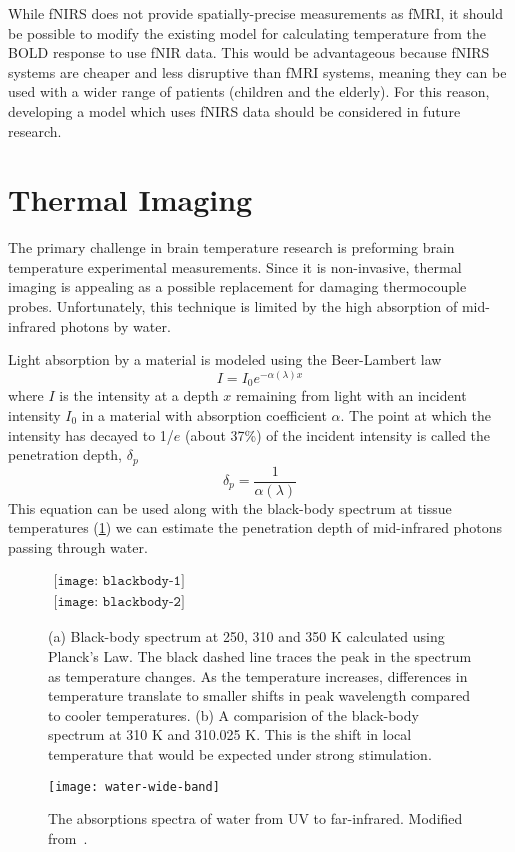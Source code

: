 While fNIRS does not provide spatially-precise measurements as fMRI, it should be possible to modify the existing model for calculating temperature from the BOLD response to use fNIR data. This would be advantageous because fNIRS systems are cheaper and less disruptive than fMRI systems, meaning they can be used with a wider range of patients (children and the elderly).  For this reason, developing a model which uses fNIRS data should be considered in future research.

\section{Thermal Imaging}
\label{sec:ThermalImaging}
The primary challenge in brain temperature research is preforming brain temperature experimental measurements.  Since it is non-invasive, thermal imaging is appealing as a possible replacement for damaging thermocouple probes.  Unfortunately, this technique is limited by the high absorption of mid-infrared photons by water.

Light absorption by a material is modeled using the Beer-Lambert law
\begin{equation}
  I = I_0 e^{-\alpha (\lambda) x} \label{eq:beerlambert}
\end{equation}
where $I$ is the intensity at a depth $x$ remaining from light with an incident intensity $I_0$ in a material with absorption coefficient $\alpha$.  The point at which the intensity has decayed to 1/$e$ (about 37\%) of the incident intensity is called the penetration depth, $\delta_{p}$
\begin{equation}
  \delta_p = \frac{1}{\alpha (\lambda)} \label{eq:penetrationdepth}
\end{equation}
This equation can be used along with the black-body spectrum at tissue temperatures (\cref{fig:blackbody}) we can estimate the penetration depth of mid-infrared photons passing through water.

\begin{figure}[p]
  \centering
  $ 
	\begin{array}{c}
		\texttt{[image: blackbody-1]} \\
		\texttt{[image: blackbody-2]} 
	\end{array}
	$
  \caption[Black-body Spectrum at 250, 310 and 350 K]{\label{fig:blackbody}(a) Black-body spectrum at 250, 310 and 350 K calculated using Planck's Law. The black dashed line traces the peak in the spectrum as temperature changes.  As the temperature increases, differences in temperature translate to smaller shifts in peak wavelength compared to cooler temperatures. (b) A comparision of the black-body spectrum at 310 K and 310.025 K.  This is the shift in local temperature that would be expected under strong stimulation.}
\end{figure}
\begin{figure}[tb]
  \centering
  \texttt{[image: water-wide-band]}
  \caption[Wide-band absorption spectra of water]{\label{fig:waterabs}The absorptions spectra of water from UV to far-infrared.  Modified from~\citet{hale73}.}
\end{figure}

